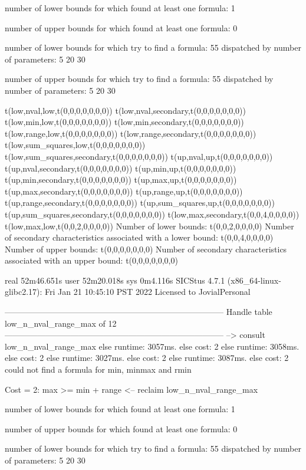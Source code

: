 number of lower bounds for which found at least one formula: 1

number of upper bounds for which found at least one formula: 0

number of lower bounds for which try to find a formula: 55
dispatched by number of parameters: 5  20  30

number of upper bounds for which try to find a formula: 55
dispatched by number of parameters: 5  20  30

t(low,nval,low,t(0,0,0,0,0,0,0))
t(low,nval,secondary,t(0,0,0,0,0,0,0))
t(low,min,low,t(0,0,0,0,0,0,0))
t(low,min,secondary,t(0,0,0,0,0,0,0))
t(low,range,low,t(0,0,0,0,0,0,0))
t(low,range,secondary,t(0,0,0,0,0,0,0))
t(low,sum_squares,low,t(0,0,0,0,0,0,0))
t(low,sum_squares,secondary,t(0,0,0,0,0,0,0))
t(up,nval,up,t(0,0,0,0,0,0,0))
t(up,nval,secondary,t(0,0,0,0,0,0,0))
t(up,min,up,t(0,0,0,0,0,0,0))
t(up,min,secondary,t(0,0,0,0,0,0,0))
t(up,max,up,t(0,0,0,0,0,0,0))
t(up,max,secondary,t(0,0,0,0,0,0,0))
t(up,range,up,t(0,0,0,0,0,0,0))
t(up,range,secondary,t(0,0,0,0,0,0,0))
t(up,sum_squares,up,t(0,0,0,0,0,0,0))
t(up,sum_squares,secondary,t(0,0,0,0,0,0,0))
t(low,max,secondary,t(0,0,4,0,0,0,0))
t(low,max,low,t(0,0,2,0,0,0,0))
Number of lower bounds:                                             t(0,0,2,0,0,0,0)
Number of secondary characteristics associated with a lower bound:  t(0,0,4,0,0,0,0)
Number of upper bounds:                                             t(0,0,0,0,0,0,0)
Number of secondary characteristics associated with an upper bound: t(0,0,0,0,0,0,0)

real	52m46.651s
user	52m20.018s
sys	0m4.116s
SICStus 4.7.1 (x86_64-linux-glibc2.17): Fri Jan 21 10:45:10 PST 2022
Licensed to JovialPersonal


--------------------------------------------------------------------------------
Handle table low_n_nval_range_max of 12
--------------------------------------------------------------------------------
--> consult low_n_nval_range_max
else runtime: 3057ms. else cost: 2
else runtime: 3058ms. else cost: 2
else runtime: 3027ms. else cost: 2
else runtime: 3087ms. else cost: 2
could not find a formula for min, minmax and rmin

Cost =  2:  max >= min + range
<-- reclaim low_n_nval_range_max

number of lower bounds for which found at least one formula: 1

number of upper bounds for which found at least one formula: 0

number of lower bounds for which try to find a formula: 55
dispatched by number of parameters: 5  20  30

